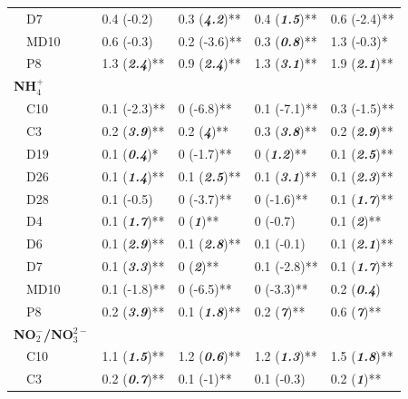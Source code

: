 \documentclass[journal = esthag, manuscript = article]{achemso}\usepackage[]{graphicx}\usepackage[]{color}
\begin{document}
\begin{table}[!tbp]
\begin{center}
\begin{tabular}{lllll}
~~D7&0.4 \footnotesize{(-0.2)}&0.3 \footnotesize{(\textit{\textbf{4.2}})**}&0.4 \footnotesize{(\textit{\textbf{1.5}})**}&0.6 \footnotesize{(-2.4)**}\tabularnewline
~~MD10&0.6 \footnotesize{(-0.3)}&0.2 \footnotesize{(-3.6)**}&0.3 \footnotesize{(\textit{\textbf{0.8}})**}&1.3 \footnotesize{(-0.3)*}\tabularnewline
~~P8&1.3 \footnotesize{(\textit{\textbf{2.4}})**}&0.9 \footnotesize{(\textit{\textbf{2.4}})**}&1.3 \footnotesize{(\textit{\textbf{3.1}})**}&1.9 \footnotesize{(\textit{\textbf{2.1}})**}\tabularnewline
\hline
{\bfseries NH$_{4}^{+}$}&&&&\tabularnewline
~~C10&0.1 \footnotesize{(-2.3)**}&0 \footnotesize{(-6.8)**}&0.1 \footnotesize{(-7.1)**}&0.3 \footnotesize{(-1.5)**}\tabularnewline
~~C3&0.2 \footnotesize{(\textit{\textbf{3.9}})**}&0.2 \footnotesize{(\textit{\textbf{4}})**}&0.3 \footnotesize{(\textit{\textbf{3.8}})**}&0.2 \footnotesize{(\textit{\textbf{2.9}})**}\tabularnewline
~~D19&0.1 \footnotesize{(\textit{\textbf{0.4}})*}&0 \footnotesize{(-1.7)**}&0 \footnotesize{(\textit{\textbf{1.2}})**}&0.1 \footnotesize{(\textit{\textbf{2.5}})**}\tabularnewline
~~D26&0.1 \footnotesize{(\textit{\textbf{1.4}})**}&0.1 \footnotesize{(\textit{\textbf{2.5}})**}&0.1 \footnotesize{(\textit{\textbf{3.1}})**}&0.1 \footnotesize{(\textit{\textbf{2.3}})**}\tabularnewline
~~D28&0.1 \footnotesize{(-0.5)}&0 \footnotesize{(-3.7)**}&0 \footnotesize{(-1.6)**}&0.1 \footnotesize{(\textit{\textbf{1.7}})**}\tabularnewline
~~D4&0.1 \footnotesize{(\textit{\textbf{1.7}})**}&0 \footnotesize{(\textit{\textbf{1}})**}&0 \footnotesize{(-0.7)}&0.1 \footnotesize{(\textit{\textbf{2}})**}\tabularnewline
~~D6&0.1 \footnotesize{(\textit{\textbf{2.9}})**}&0.1 \footnotesize{(\textit{\textbf{2.8}})**}&0.1 \footnotesize{(-0.1)}&0.1 \footnotesize{(\textit{\textbf{2.1}})**}\tabularnewline
~~D7&0.1 \footnotesize{(\textit{\textbf{3.3}})**}&0 \footnotesize{(\textit{\textbf{2}})**}&0.1 \footnotesize{(-2.8)**}&0.1 \footnotesize{(\textit{\textbf{1.7}})**}\tabularnewline
~~MD10&0.1 \footnotesize{(-1.8)**}&0 \footnotesize{(-6.5)**}&0 \footnotesize{(-3.3)**}&0.2 \footnotesize{(\textit{\textbf{0.4}})}\tabularnewline
~~P8&0.2 \footnotesize{(\textit{\textbf{3.9}})**}&0.1 \footnotesize{(\textit{\textbf{1.8}})**}&0.2 \footnotesize{(\textit{\textbf{7}})**}&0.6 \footnotesize{(\textit{\textbf{7}})**}\tabularnewline
\hline
{\bfseries NO$_{2}^{-}$/NO$_{3}^{2-}$}&&&&\tabularnewline
~~C10&1.1 \footnotesize{(\textit{\textbf{1.5}})**}&1.2 \footnotesize{(\textit{\textbf{0.6}})**}&1.2 \footnotesize{(\textit{\textbf{1.3}})**}&1.5 \footnotesize{(\textit{\textbf{1.8}})**}\tabularnewline
~~C3&0.2 \footnotesize{(\textit{\textbf{0.7}})**}&0.1 \footnotesize{(-1)**}&0.1 \footnotesize{(-0.3)}&0.2 \footnotesize{(\textit{\textbf{1}})**}\tabularnewline

\end{tabular}
\end{center}
\end{table}
\end{document}
